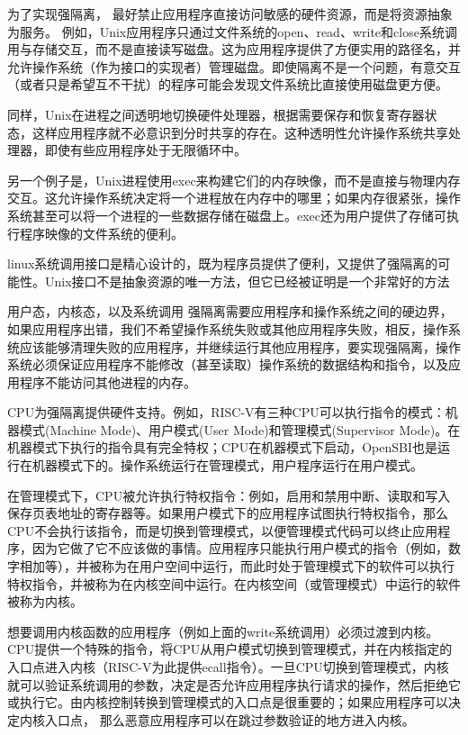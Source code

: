 \documentclass[lang=cn,10pt]{elegantbook}
\begin{document}
为了实现强隔离， 最好禁止应用程序直接访问敏感的硬件资源，而是将资源抽象为服务。 例如，Unix应用程序只通过文件系统的open、read、write和close系统调用与存储交互，而不是直接读写磁盘。这为应用程序提供了方便实用的路径名，并允许操作系统（作为接口的实现者）管理磁盘。即使隔离不是一个问题，有意交互（或者只是希望互不干扰）的程序可能会发现文件系统比直接使用磁盘更方便。

同样，Unix在进程之间透明地切换硬件处理器，根据需要保存和恢复寄存器状态，这样应用程序就不必意识到分时共享的存在。这种透明性允许操作系统共享处理器，即使有些应用程序处于无限循环中。

另一个例子是，Unix进程使用exec来构建它们的内存映像，而不是直接与物理内存交互。这允许操作系统决定将一个进程放在内存中的哪里；如果内存很紧张，操作系统甚至可以将一个进程的一些数据存储在磁盘上。exec还为用户提供了存储可执行程序映像的文件系统的便利。

linux系统调用接口是精心设计的，既为程序员提供了便利，又提供了强隔离的可能性。Unix接口不是抽象资源的唯一方法，但它已经被证明是一个非常好的方法

用户态，内核态，以及系统调用
强隔离需要应用程序和操作系统之间的硬边界，如果应用程序出错，我们不希望操作系统失败或其他应用程序失败，相反，操作系统应该能够清理失败的应用程序，并继续运行其他应用程序，要实现强隔离，操作系统必须保证应用程序不能修改（甚至读取）操作系统的数据结构和指令，以及应用程序不能访问其他进程的内存。

CPU为强隔离提供硬件支持。例如，RISC-V有三种CPU可以执行指令的模式：机器模式(Machine Mode)、用户模式(User Mode)和管理模式(Supervisor Mode)。在机器模式下执行的指令具有完全特权；CPU在机器模式下启动，OpenSBI也是运行在机器模式下的。操作系统运行在管理模式，用户程序运行在用户模式。

在管理模式下，CPU被允许执行特权指令：例如，启用和禁用中断、读取和写入保存页表地址的寄存器等。如果用户模式下的应用程序试图执行特权指令，那么CPU不会执行该指令，而是切换到管理模式，以便管理模式代码可以终止应用程序，因为它做了它不应该做的事情。应用程序只能执行用户模式的指令（例如，数字相加等），并被称为在用户空间中运行，而此时处于管理模式下的软件可以执行特权指令，并被称为在内核空间中运行。在内核空间（或管理模式）中运行的软件被称为内核。

想要调用内核函数的应用程序（例如上面的write系统调用）必须过渡到内核。CPU提供一个特殊的指令，将CPU从用户模式切换到管理模式，并在内核指定的入口点进入内核（RISC-V为此提供ecall指令）。一旦CPU切换到管理模式，内核就可以验证系统调用的参数，决定是否允许应用程序执行请求的操作，然后拒绝它或执行它。由内核控制转换到管理模式的入口点是很重要的；如果应用程序可以决定内核入口点， 那么恶意应用程序可以在跳过参数验证的地方进入内核。
\end{document}
